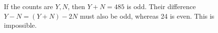If the counts are $Y,N$, then $Y+N=485$ is odd. Their difference $Y-N=(Y+N)-2N$ must also be odd, whereas 24 is even. This is impossible.
